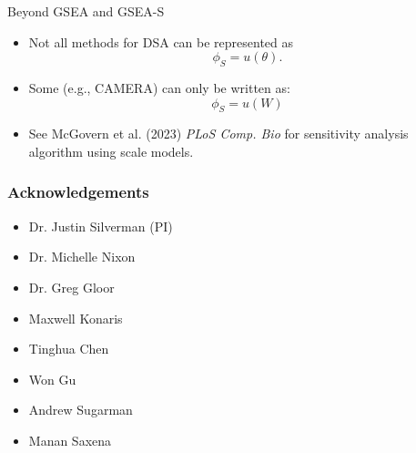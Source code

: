 \documentclass{beamer}
\begin{document}
\begin{frame}[label={sec:org8f90c24}]{Beyond GSEA and GSEA-S}
\begin{itemize}
\item Not all methods for DSA can be represented as \[\phi_{S}=u(\theta).\]
\end{itemize}
\vfill
\begin{itemize}
\item Some (e.g., CAMERA) can only be written as:  \[\phi_{S}=u(W)\]
\end{itemize}
\vfill
\begin{itemize}
\item See McGovern et al. (2023) \textit{PLoS Comp. Bio} for sensitivity analysis algorithm using scale models.
\end{itemize}
\end{frame}

\begin{frame}
  \frametitle{Acknowledgements}
  \begin{itemize}
    \item Dr. Justin Silverman (PI)
    \item Dr. Michelle Nixon
    \item Dr. Greg Gloor 
    \item Maxwell Konaris
    \item Tinghua Chen
    \item Won Gu
    \item Andrew Sugarman
    \item Manan Saxena
  \end{itemize}
\end{frame}
\end{document}
